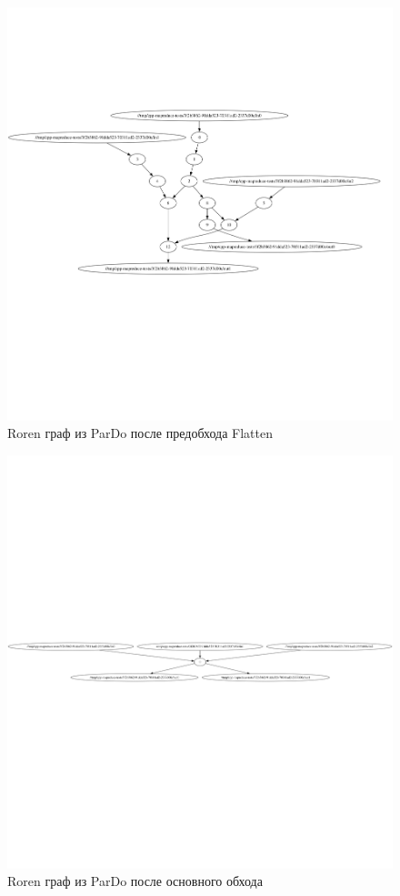\begin{figure}[h]
    \centering
    \includegraphics[width=\textwidth]{img/roren2.png}
    \caption{Roren граф из ParDo после предобхода Flatten}
    \label{fig:roren2}
\end{figure}

\begin{figure}[h]
    \centering
    \includegraphics[width=\textwidth]{img/roren3.png}
    \caption{Roren граф из ParDo после основного обхода}
    \label{fig:roren3}
\end{figure}

